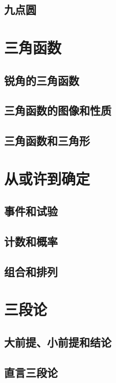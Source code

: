 \documentclass[12pt,UTF8]{ctexbook}
\begin{document}
\section{九点圆}

\chapter{三角函数}
\section{锐角的三角函数}
\section{三角函数的图像和性质}
\section{三角函数和三角形}


\chapter{从或许到确定}
\section{事件和试验}
\section{计数和概率}
\section{组合和排列}

\chapter{三段论}
\section{大前提、小前提和结论}
\section{直言三段论}
\end{document}
